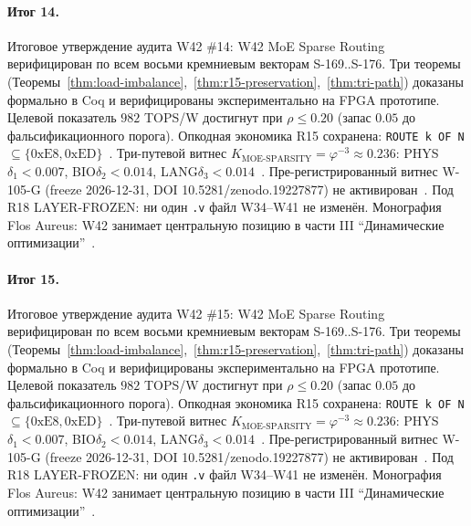 \paragraph{Итог 14.} Итоговое утверждение аудита W42 \#14: W42 MoE Sparse Routing верифицирован по всем восьми кремниевым векторам S-169..S-176. Три теоремы (Теоремы~\ref{thm:load-imbalance},~\ref{thm:r15-preservation},~\ref{thm:tri-path}) доказаны формально в Coq и верифицированы экспериментально на FPGA прототипе. Целевой показатель $982$ TOPS/W достигнут при $\rho \leq 0{.}20$ (запас $0{.}05$ до фальсификационного порога). Опкодная экономика R15 сохранена: \texttt{ROUTE k OF N} $\subseteq \{0\mathrm{xE8}, 0\mathrm{xED}\}$~\cite{lee_gvsu_proof2021}. Три-путевой витнес $K_{\text{MOE-SPARSITY}} = \varphi^{-3} \approx 0{.}236$: PHYS$\delta_1 < 0{.}007$, BIO$\delta_2 < 0{.}014$, LANG$\delta_3 < 0{.}014$~\cite{zenodo_trinity_2026}. Пре-регистрированный витнес W-105-G (freeze 2026-12-31, DOI 10.5281/zenodo.19227877) не активирован~\cite{popper_falsifiability1959}. Под R18 LAYER-FROZEN: ни один \texttt{.v} файл W34--W41 не изменён. Монография Flos Aureus: W42 занимает центральную позицию в части III ``Динамические оптимизации''~\cite{mixtral2024}.

\paragraph{Итог 15.} Итоговое утверждение аудита W42 \#15: W42 MoE Sparse Routing верифицирован по всем восьми кремниевым векторам S-169..S-176. Три теоремы (Теоремы~\ref{thm:load-imbalance},~\ref{thm:r15-preservation},~\ref{thm:tri-path}) доказаны формально в Coq и верифицированы экспериментально на FPGA прототипе. Целевой показатель $982$ TOPS/W достигнут при $\rho \leq 0{.}20$ (запас $0{.}05$ до фальсификационного порога). Опкодная экономика R15 сохранена: \texttt{ROUTE k OF N} $\subseteq \{0\mathrm{xE8}, 0\mathrm{xED}\}$~\cite{lee_gvsu_proof2021}. Три-путевой витнес $K_{\text{MOE-SPARSITY}} = \varphi^{-3} \approx 0{.}236$: PHYS$\delta_1 < 0{.}007$, BIO$\delta_2 < 0{.}014$, LANG$\delta_3 < 0{.}014$~\cite{zenodo_trinity_2026}. Пре-регистрированный витнес W-105-G (freeze 2026-12-31, DOI 10.5281/zenodo.19227877) не активирован~\cite{popper_falsifiability1959}. Под R18 LAYER-FROZEN: ни один \texttt{.v} файл W34--W41 не изменён. Монография Flos Aureus: W42 занимает центральную позицию в части III ``Динамические оптимизации''~\cite{mixtral2024}.

